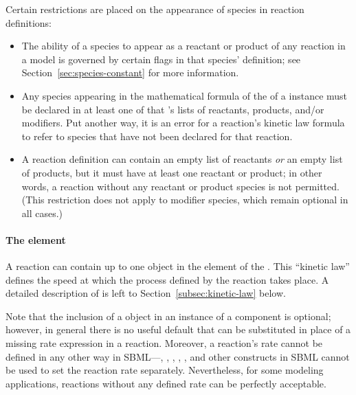 Certain restrictions are placed on the appearance of species in
reaction definitions:
\begin{itemize}
  
\item The ability of a species to appear as a reactant or product
  of any reaction in a model is governed by certain flags in that
  species' definition; see Section~\ref{sec:species-constant} for
  more information.
  
\item Any species appearing in the mathematical formula of the
   of a \Reaction instance must be declared in
  at least one of that \Reaction's lists of reactants, products,
  and/or modifiers.  Put another way, it is an error for a
  reaction's kinetic law formula to refer to species that have not
  been declared for that reaction.
  
\item A reaction definition can contain an empty list of reactants
  \emph{or} an empty list of products, but it must have at least
  one reactant or product; in other words, a reaction without any
  reactant or product species is not permitted.  (This restriction
  does not apply to modifier species, which remain optional in all
  cases.)

\end{itemize}


\paragraph{The  element}

A reaction can contain up to one \KineticLaw object in the
 element of the \Reaction.  This ``kinetic law''
defines the speed at which the process defined by the reaction
takes place.  A detailed description of \KineticLaw is left to
Section~\ref{subsec:kinetic-law} below.

Note that the inclusion of a \KineticLaw object in an instance
of a \Reaction component is optional; however, in general there is
no useful default that can be substituted in place of a missing
rate expression in a reaction.  Moreover, a reaction's rate cannot
be defined in any other way in SBML---\InitialAssignment,
\AssignmentRule, \RateRule, \AlgebraicRule, \Event, and other
constructs in SBML cannot be used to set the reaction rate
separately.  Nevertheless, for some modeling applications,
reactions without any defined rate can be perfectly acceptable.

